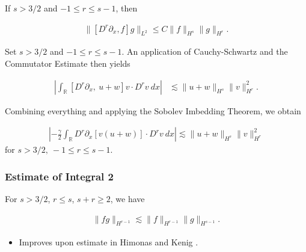 \documentclass[handout]{beamer}
\numberwithin{equation}{section}
\newcommand{\rr}{\mathbb{R}}
\newcommand{\p}{\partial}
\begin{document}
\begin{frame}
    \begin{lemma}
\label{cor1}
If $s > 3/2$ and $-1 \le r  \le s -1$, then


\begin{equation*}
\begin{split}
\|[D^r \p_x ,f]g\|_{L^2} \le C \|f\|_{H^s} \|g\|_{H^r}.
\label{15}
\end{split}
\end{equation*}


\end{lemma}
\end{frame}

\begin{frame}
Set $s > 3/2$ and $-1 \le r \le s -1$. An application of 
Cauchy-Schwartz and the Commutator Estimate then yields 


\begin{equation*}
\begin{split}
 \left | \int_{\rr} [D^r \p_x, \ u+w] v
\cdot D^r v \ dx \right |
& \lesssim \|u+w\|_{H^s} 
\|v\|_{H^r}^2.
\label{7v}
\end{split}
\end{equation*}


Combining everything and applying the Sobolev Imbedding 
Theorem, we obtain 


\begin{equation*}
\begin{split}
\left |  -\frac{\gamma}{2} \int_{\rr} D^r \p_x [v(u+w)] \cdot
D^r v \ dx \right |
 \lesssim \|u+w\|_{H^s} \|v\|_{H^r}^2
\label{8v}
\end{split}
\end{equation*}
for $s > 3/2, \ -1 \le r \le s-1$.
\end{frame}

\begin{frame}
\frametitle{Estimate of Integral 2} 







\begin{lemma}
For $s > 3/2$, $r \le s$, $s + r \ge 2$, we have


\begin{equation*}
\begin{split}
  \| fg \|_{H^{r-1}} \lesssim \| f \|_{H^{r-1}} \| g \|_{H^{s-1}}.
\end{split}
\end{equation*}


\label{lem:frac-deriv}
\end{lemma}

\begin{itemize}
    \item  Improves upon estimate in Himonas and Kenig \cite{Himonas:2009fk}.
\end{itemize}

\end{frame}
\end{document}
